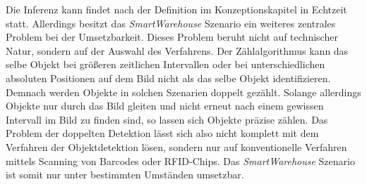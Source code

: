 Die Inferenz kann findet nach der Definition im Konzeptionskapitel in Echtzeit statt. Allerdings besitzt das \textit{SmartWarehouse} Szenario ein weiteres zentrales Problem bei der Umsetzbarkeit. Dieses Problem beruht nicht auf technischer Natur, sondern auf der Auswahl des Verfahrens. Der Zählalgorithmus kann das selbe Objekt bei größeren zeitlichen Intervallen oder bei unterschiedlichen absoluten Positionen auf dem Bild nicht als das selbe Objekt identifizieren. Demnach werden Objekte in solchen Szenarien doppelt gezählt. Solange allerdings Objekte nur durch das Bild \glqq gleiten\grqq{} und nicht erneut nach einem gewissen Intervall im Bild zu finden sind, so lassen sich Objekte präzise zählen. Das Problem der doppelten Detektion lässt sich also nicht komplett mit dem Verfahren der Objektdetektion lösen, sondern nur auf konventionelle Verfahren mittels Scanning von Barcodes oder RFID-Chips. Das \textit{SmartWarehouse} Szenario ist somit nur unter bestimmten Umständen umsetzbar. 
